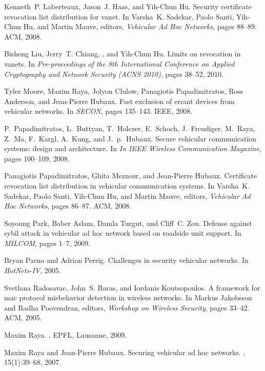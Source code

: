 \documentclass[conference]{IEEEtran}[10pt]
\begin{document}
\begin{thebibliography}{10}
Kenneth~P. Laberteaux, Jason~J. Haas, and Yih-Chun Hu.
\newblock Security certificate revocation list distribution for vanet.
\newblock In Varsha~K. Sadekar, Paolo Santi, Yih-Chun Hu, and Martin Mauve,
  editors, {\em Vehicular Ad Hoc Networks}, pages 88--89. ACM, 2008.

Bisheng Liu, Jerry~T. Chiang, , and Yih-Chun Hu.
\newblock Limits on revocation in vanets.
\newblock In {\em Pre-proceedings of the 8th International Conference on
  Applied Cryptography and Network Security (ACNS 2010)}, pages 38--52, 2010.

Tyler Moore, Maxim Raya, Jolyon Clulow, Panagiotis Papadimitratos, Ross
  Anderson, and Jean-Pierre Hubaux.
\newblock Fast exclusion of errant devices from vehicular networks.
\newblock In {\em SECON}, pages 135--143. IEEE, 2008.

P.~Papadimitratos, L.~Buttyan, T.~Holczer, E.~Schoch, J.~Freudiger, M.~Raya,
  Z.~Ma, F.~Kargl, A.~Kung, and J.~p.~Hubaux.
\newblock Secure vehicular communication systems: design and architecture.
\newblock In {\em In IEEE Wireless Communication Magazine}, pages 100--109,
  2008.

Panagiotis Papadimitratos, Ghita Mezzour, and Jean-Pierre Hubaux.
\newblock Certificate revocation list distribution in vehicular communication
  systems.
\newblock In Varsha~K. Sadekar, Paolo Santi, Yih-Chun Hu, and Martin Mauve,
  editors, {\em Vehicular Ad Hoc Networks}, pages 86--87. ACM, 2008.

Soyoung Park, Baber Aslam, Damla Turgut, and Cliff~C. Zou.
\newblock Defense against sybil attack in vehicular ad hoc network based on
  roadside unit support.
\newblock In {\em MILCOM}, pages 1--7, 2009.

Bryan Parno and Adrian Perrig.
\newblock Challenges in security vehicular networks.
\newblock In {\em HotNets-IV}, 2005.

Svetlana Radosavac, John~S. Baras, and Iordanis Koutsopoulos.
\newblock A framework for mac protocol misbehavior detection in wireless
  networks.
\newblock In Markus Jakobsson and Radha Poovendran, editors, {\em Workshop on
  Wireless Security}, pages 33--42. ACM, 2005.

Maxim Raya.
.
\newblock EPFL, Lausanne, 2009.

Maxim Raya and Jean-Pierre Hubaux.
\newblock Securing vehicular ad hoc networks.
, 15(1):39--68, 2007.


\end{thebibliography}
\end{document}
